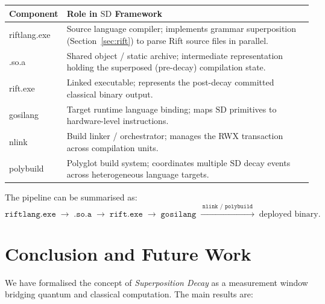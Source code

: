 \documentclass[12pt, a4paper]{article}
\theoremstyle{plain}
\theoremstyle{definition}
\theoremstyle{remark}
\newcommand{\SD}{\ensuremath{\mathrm{SD}}}   %
\begin{document}
\begin{center}
\renewcommand{\arraystretch}{1.4}
\begin{tabular}{@{}>{\ttfamily}p{3cm}p{9cm}@{}}
  \toprule
  \normalfont\textbf{Component} & \textbf{Role in \SD{} Framework} \\
  \midrule
  riftlang.exe   & Source language compiler; implements grammar superposition
                   (Section~\ref{sec:rift}) to parse Rift source files in
                   parallel. \\
  .so.a          & Shared object / static archive; intermediate representation
                   holding the superposed (pre-decay) compilation state. \\
  rift.exe       & Linked executable; represents the post-decay committed
                   classical binary output. \\
  gosilang       & Target runtime language binding; maps \SD{} primitives to
                   hardware-level instructions. \\
  nlink          & Build linker / orchestrator; manages the RWX transaction
                   across compilation units. \\
  polybuild      & Polyglot build system; coordinates multiple \SD{} decay
                   events across heterogeneous language targets. \\
  \bottomrule
\end{tabular}
\end{center}

The pipeline can be summarised as:
\[
  \texttt{riftlang.exe} \;\to\; \texttt{.so.a} \;\to\; \texttt{rift.exe}
  \;\to\; \texttt{gosilang} \;\xrightarrow{\;\texttt{nlink / polybuild}\;}\;
  \text{deployed binary}.
\]

\section{Conclusion and Future Work}
\label{sec:conclusion}

We have formalised the concept of \emph{Superposition Decay} as a
measurement window bridging quantum and classical computation.  The main
results are:
\end{document}
